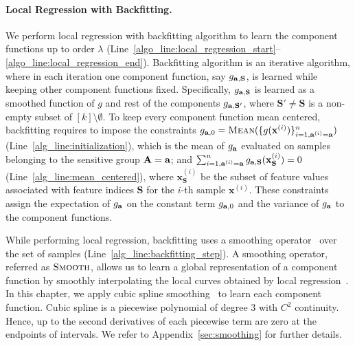 \paragraph{Local Regression with Backfitting.} We perform local regression with backfitting algorithm to learn the component functions up to order $ \lambda $ (Line~\ref{algo_line:local_regression_start}--\ref{algo_line:local_regression_end}). Backfitting algorithm is an iterative algorithm, where in each iteration one component function, say $ g_{\mathbf{a}, \mathbf{S}} $, is learned while keeping other component functions fixed. Specifically, $ g_{\mathbf{a}, \mathbf{S}} $ is learned as a smoothed function of $ g $ and rest of the components $ g_{\mathbf{a}, \mathbf{S}'} $, where $ \mathbf{S}' \ne \mathbf{S} $ is a non-empty subset of $ [k]\setminus \emptyset $. To keep every component function mean centered, backfitting requires to impose the constraints $ g_{\mathbf{a}, 0} = \textsc{Mean}(\{g(\mathbf{x}^{(i)})\}_{i=1, \mathbf{a}^{(i)} = \mathbf{a}}^n) $ (Line~\ref{alg_line:initialization}), which is the mean of $ g_{\mathbf{a}} $ evaluated on samples belonging to the sensitive group $ \mathbf{A} = \mathbf{a} $;  and $ \sum_{i=1, \mathbf{a}^{(i)} = \mathbf{a}}^ng_{\mathbf{a}, \mathbf{S}}(\mathbf{x}_{\mathbf{S}}^{(i)}) = 0$ (Line~\ref{alg_line:mean_centered}), where $ \mathbf{x}_{\mathbf{S}}^{(i)} $ be the subset of feature values associated with feature indices $ \mathbf{S} $ for the $ i $-th sample $ \mathbf{x}^{(i)} $. These constraints assign the expectation of $ g_{\mathbf{a}} $ on the constant term $ g_{\mathbf{a}, 0} $ and the variance of $ g_{\mathbf{a}} $ to the component functions.                                       


While performing local regression, backfitting uses a smoothing operator~\cite{loader2012smoothing} over the set of samples (Line~\ref{alg_line:backfitting_step}). A smoothing operator, referred as $ \textsc{Smooth} $, allows us to learn a global representation of a component function by smoothly interpolating the local curves obtained by local regression~\cite{loader2012smoothing}. In this chapter, we apply cubic spline smoothing~\cite{li2010global} to learn each component function. Cubic spline is a piecewise polynomial of degree $ 3 $ with $ C^2 $ continuity. Hence, up to the second derivatives of each piecewise term are zero at the endpoints of intervals. We refer to Appendix~\ref{sec:smoothing} for further details.%


